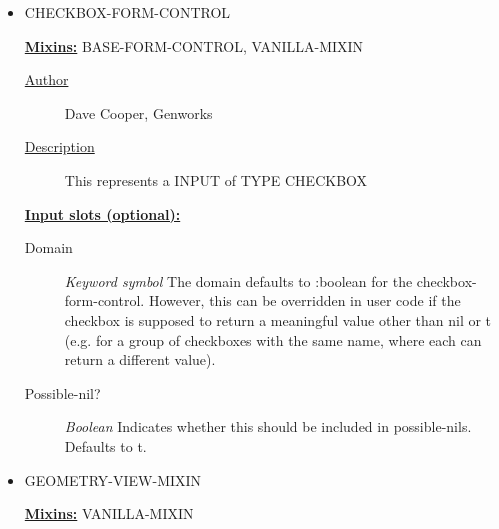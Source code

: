 \documentclass [11pt]{book}
\begin{document}
\begin{itemize}
\begin{description}
\end{description}







\item {}CHECKBOX-FORM-CONTROL


\textbf{
\underline{Mixins:}} BASE-FORM-CONTROL, VANILLA-MIXIN





\begin{description}

\item [
\underline{Author}]


Dave Cooper, Genworks



\item [
\underline{Description}]


This represents a INPUT of TYPE CHECKBOX



\end{description}








\textbf{
\underline{Input slots (optional):}}

\begin{description}

\item [Domain]
\emph{Keyword symbol} The domain defaults to :boolean for the checkbox-form-control.
However, this can be overridden in user code if the checkbox is supposed to return
a meaningful value other than nil or t (e.g. for a group of checkboxes with
the same name, where each can return a different value).


\item [Possible-nil?]
\emph{Boolean} Indicates whether this should be included in possible-nils. Defaults to t.


\end{description}







\item {}GEOMETRY-VIEW-MIXIN


\textbf{
\underline{Mixins:}} VANILLA-MIXIN






\end{itemize}
\end{document}
